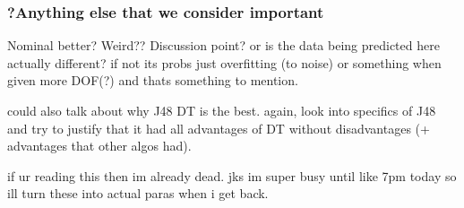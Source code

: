 \subsubsection{?Anything else that we consider important}

Nominal better? Weird?? Discussion point?
or is the data being predicted here actually different? if not its probs just overfitting (to noise) or something when given more DOF(?) and thats something to mention.


could also talk about why J48 DT is the best. again, look into specifics of J48 and try to justify that it had all advantages of DT without disadvantages (+ advantages that other algos had).


if ur reading this then im already dead. jks im super busy until like 7pm today so ill turn these into actual paras when i get back.
